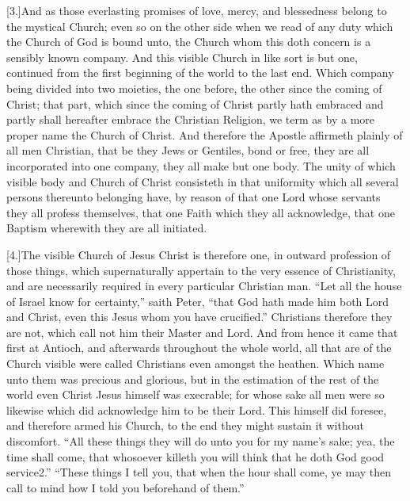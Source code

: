 [3.]And as those everlasting promises of love, mercy, and blessedness belong to the mystical Church; even so on the other side when we read of any duty which the Church of God is bound unto, the Church whom this doth concern is a sensibly known company. And this visible Church in like sort is but one, continued from the first beginning of the world to the last end. Which company being divided into two moieties, the one before, the other since the coming of Christ; that part, which since the coming of Christ partly hath embraced and partly shall hereafter embrace the Christian Religion, we term as by a more proper name the Church of Christ. And therefore the Apostle affirmeth plainly of all men Christian, that be they Jews or Gentiles, bond or free, they are all incorporated into one company, they all make but one body. The unity of which visible body and Church of Christ consisteth in that uniformity which all several persons thereunto belonging have, by reason of that one Lord whose servants they all profess themselves, that one Faith which they all acknowledge, that one Baptism wherewith they are all initiated.

[4.]The visible Church of Jesus Christ is therefore one, in outward profession of those things, which supernaturally appertain to the very essence of Christianity, and are necessarily required in every particular Christian man. “Let all the house of Israel know for certainty,” saith Peter, “that God hath made him both Lord and Christ, even this Jesus whom you have crucified.” Christians therefore they are not, which call not him their Master and Lord. And from hence it came that first at Antioch, and afterwards throughout the whole world, all that are of the Church visible were  called Christians even amongst the heathen. Which name unto them was precious and glorious, but in the estimation of the rest of the world even Christ Jesus himself was execrable; for whose sake all men were so likewise which did acknowledge him to be their Lord. This himself did foresee, and therefore armed his Church, to the end they might sustain it without discomfort. “All these things they will do unto you for my name’s sake; yea, the time shall come, that whosoever killeth you will think that he doth God good service2.” “These things I tell you, that when the hour shall come, ye may then call to mind how I told you beforehand of them.”

